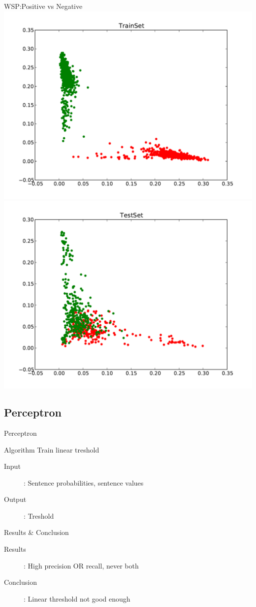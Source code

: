 \documentclass{beamer}
\begin{document}
\begin{frame}{WSP:Positive vs Negative}
\centering
\includegraphics[scale=0.25]{PosNegScatter1.pdf}
\includegraphics[scale=0.25]{PosNegScatter2.pdf}
\end{frame}

\subsection{Perceptron}
\begin{frame}{Perceptron}
\begin{block}{Algorithm}
Train linear treshold
\end{block}
\begin{description}
\item[Input]: Sentence probabilities, sentence values
\item[Output]: Treshold
\end{description}
\end{frame}
\begin{frame}{Results \& Conclusion}
\begin{description}
\item[Results]: High precision OR recall, never both
\item[Conclusion]: Linear threshold not good enough
\end{description}
\end{frame}
\end{document}
